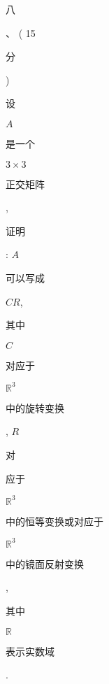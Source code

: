 \documentclass[10pt]{article}
\begin{document}
\begin{CJK}{UTF8}{mj}八\end{CJK}、 ( 15 \begin{CJK}{UTF8}{mj}分\end{CJK}) \begin{CJK}{UTF8}{mj}设\end{CJK} $A$ \begin{CJK}{UTF8}{mj}是一个\end{CJK} $3 \times 3$ \begin{CJK}{UTF8}{mj}正交矩阵\end{CJK}, \begin{CJK}{UTF8}{mj}证明\end{CJK}: $A$ \begin{CJK}{UTF8}{mj}可以写成\end{CJK} $C R$, \begin{CJK}{UTF8}{mj}其中\end{CJK} $C$ \begin{CJK}{UTF8}{mj}对应于\end{CJK} $\mathbb{R}^{3}$ \begin{CJK}{UTF8}{mj}中的旋转变换\end{CJK}, $R$ \begin{CJK}{UTF8}{mj}对\end{CJK} \begin{CJK}{UTF8}{mj}应于\end{CJK} $\mathbb{R}^{3}$ \begin{CJK}{UTF8}{mj}中的恒等变换或对应于\end{CJK} $\mathbb{R}^{3}$ \begin{CJK}{UTF8}{mj}中的镜面反射变换\end{CJK}, \begin{CJK}{UTF8}{mj}其中\end{CJK} $\mathbb{R}$ \begin{CJK}{UTF8}{mj}表示实数域\end{CJK}.
\end{document}
